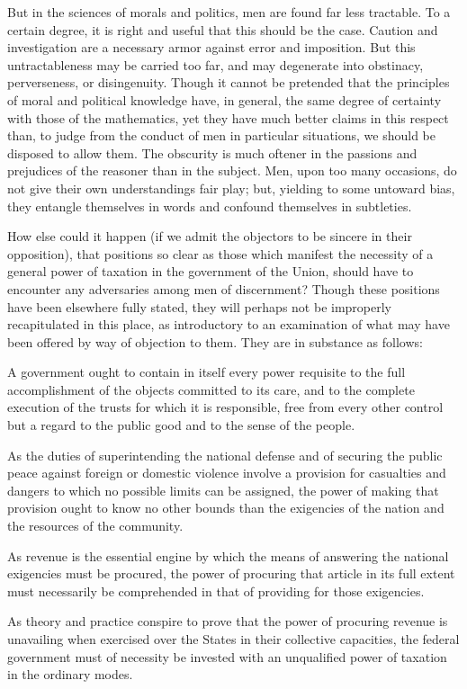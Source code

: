 But in the sciences of morals and politics, men are found far less tractable. To a certain degree, it is right and useful that this should be the case. Caution and investigation are a necessary armor against error and imposition. But this untractableness may be carried too far, and may degenerate into obstinacy, perverseness, or disingenuity. Though it cannot be pretended that the principles of moral and political knowledge have, in general, the same degree of certainty with those of the mathematics, yet they have much better claims in this respect than, to judge from the conduct of men in particular situations, we should be disposed to allow them. The obscurity is much oftener in the passions and prejudices of the reasoner than in the subject. Men, upon too many occasions, do not give their own understandings fair play; but, yielding to some untoward bias, they entangle themselves in words and confound themselves in subtleties.

How else could it happen (if we admit the objectors to be sincere in their opposition), that positions so clear as those which manifest the necessity of a general power of taxation in the government of the Union, should have to encounter any adversaries among men of discernment? Though these positions have been elsewhere fully stated, they will perhaps not be improperly recapitulated in this place, as introductory to an examination of what may have been offered by way of objection to them. They are in substance as follows:

A government ought to contain in itself every power requisite to the full accomplishment of the objects committed to its care, and to the complete execution of the trusts for which it is responsible, free from every other control but a regard to the public good and to the sense of the people.

As the duties of superintending the national defense and of securing the public peace against foreign or domestic violence involve a provision for casualties and dangers to which no possible limits can be assigned, the power of making that provision ought to know no other bounds than the exigencies of the nation and the resources of the community.

As revenue is the essential engine by which the means of answering the national exigencies must be procured, the power of procuring that article in its full extent must necessarily be comprehended in that of providing for those exigencies.

As theory and practice conspire to prove that the power of procuring revenue is unavailing when exercised over the States in their collective capacities, the federal government must of necessity be invested with an unqualified power of taxation in the ordinary modes.

